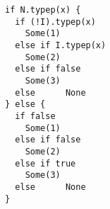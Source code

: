 \begin{lstlisting}[style=scalaioScala]
if N.typep(x) {
  if (!I).typep(x)
    Some(1)
  else if I.typep(x)
    Some(2)
  else if false
    Some(3)
  else      None
} else {
  if false
    Some(1)
  else if false
    Some(2)
  else if true
    Some(3)
  else      None
}
\end{lstlisting}
